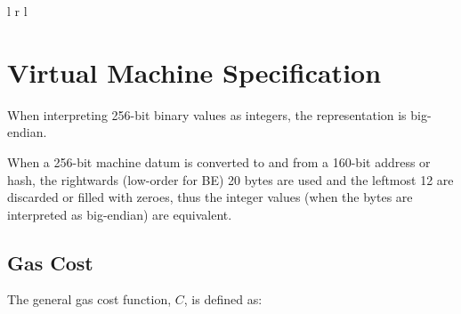 \documentclass[9pt,oneside]{amsart}
\begin{document}
\begin{tabu}{l r l}
\bottomrule
\end{tabu}

\section{Virtual Machine Specification}\label{app:vm}

When interpreting 256-bit binary values as integers, the representation is big-endian.

When a 256-bit machine datum is converted to and from a 160-bit address or hash, the rightwards (low-order for BE) 20 bytes are used and the leftmost 12 are discarded or filled with zeroes, thus the integer values (when the bytes are interpreted as big-endian) are equivalent.

\subsection{Gas Cost}

The general gas cost function, $C$, is defined as:
\end{document}
